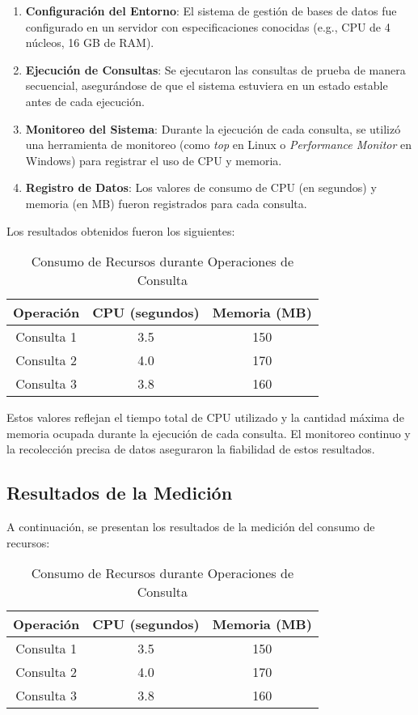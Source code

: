 \documentclass{article}
\begin{document}
\begin{enumerate}
    \item \textbf{Configuración del Entorno}: El sistema de gestión de bases de datos fue configurado en un servidor con especificaciones conocidas (e.g., CPU de 4 núcleos, 16 GB de RAM).
    \item \textbf{Ejecución de Consultas}: Se ejecutaron las consultas de prueba de manera secuencial, asegurándose de que el sistema estuviera en un estado estable antes de cada ejecución.
    \item \textbf{Monitoreo del Sistema}: Durante la ejecución de cada consulta, se utilizó una herramienta de monitoreo (como \textit{top} en Linux o \textit{Performance Monitor} en Windows) para registrar el uso de CPU y memoria.
    \item \textbf{Registro de Datos}: Los valores de consumo de CPU (en segundos) y memoria (en MB) fueron registrados para cada consulta.
\end{enumerate}

Los resultados obtenidos fueron los siguientes:

\begin{table}[h!]
    \centering
    \begin{tabular}{|c|c|c|}
        \hline
        Operación & CPU (segundos) & Memoria (MB) \\
        \hline
        Consulta 1 & 3.5 & 150 \\
        Consulta 2 & 4.0 & 170 \\
        Consulta 3 & 3.8 & 160 \\
        \hline
    \end{tabular}
    \caption{Consumo de Recursos durante Operaciones de Consulta}
\end{table}

Estos valores reflejan el tiempo total de CPU utilizado y la cantidad máxima de memoria ocupada durante la ejecución de cada consulta. El monitoreo continuo y la recolección precisa de datos aseguraron la fiabilidad de estos resultados.


\subsection{Resultados de la Medición}
A continuación, se presentan los resultados de la medición del consumo de recursos:

\begin{table}[h!]
    \centering
    \begin{tabular}{|c|c|c|}
        \hline
        Operación & CPU (segundos) & Memoria (MB) \\
        \hline
        Consulta 1 & 3.5 & 150 \\
        Consulta 2 & 4.0 & 170 \\
        Consulta 3 & 3.8 & 160 \\
        \hline
    \end{tabular}
    \caption{Consumo de Recursos durante Operaciones de Consulta}
\end{table}





\printbibliography
\end{document}
